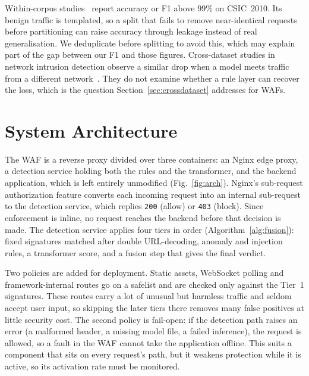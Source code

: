 \documentclass[conference]{IEEEtran}
\begin{document}
Within-corpus
studies~\cite{scireports2024novelxsssqli,wadbert2026} report accuracy or F1
above $99\%$ on CSIC~2010. Its benign traffic is templated, so a split that
fails to remove near-identical requests before partitioning can raise
accuracy through leakage instead of real generalisation. We deduplicate
before splitting to avoid this, which may explain part of the gap between
our F1 and those figures. Cross-dataset studies in network intrusion
detection observe a similar drop when a model meets traffic from a different
network~\cite{cantone2024crossdataset,venkatesan2026crossdataset}. They do
not examine whether a rule layer can recover the loss, which is the
question Section~\ref{sec:crossdataset} addresses for WAFs.

\section{System Architecture}
The WAF is a reverse proxy divided over three containers: an Nginx edge
proxy, a detection service holding both the rules and the transformer, and
the backend application, which is left entirely unmodified
(Fig.~\ref{fig:arch}). Nginx's sub-request authorization feature converts
each incoming request into an internal sub-request to the detection service,
which replies \texttt{200} (allow) or \texttt{403} (block). Since
enforcement is inline, no request reaches the backend before that decision
is made. The detection service applies four tiers in order
(Algorithm~\ref{alg:fusion}): fixed signatures matched after double
URL-decoding, anomaly and injection rules, a transformer score, and a
fusion step that gives the final verdict.

Two policies are added for deployment. Static assets, WebSocket polling and
framework-internal routes go on a safelist and are checked only against the
Tier~1 signatures. These routes carry a lot of unusual but harmless traffic
and seldom accept user input, so skipping the later tiers there removes many
false positives at little security cost. The second policy is fail-open: if
the detection path raises an error (a malformed header, a missing model
file, a failed inference), the request is allowed, so a fault in the WAF
cannot take the application offline. This suits a component that sits on
every request's path, but it weakens protection while it is active, so its
activation rate must be monitored.
\end{document}
